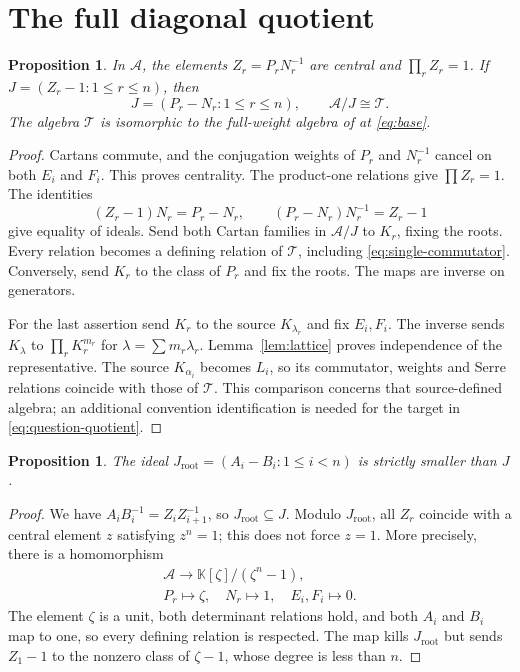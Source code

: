 \documentclass[11pt]{article}
\newtheorem{proposition}[theorem]{Proposition}
\theoremstyle{definition}
\theoremstyle{remark}
\newcommand{\kk}{\mathbb{K}}
\newcommand{\cA}{\mathcal{A}}
\newcommand{\cT}{\mathcal{T}}
\begin{document}
\section{The full diagonal quotient}\label{sec:quotient}

\begin{proposition}\label{prop:quotient}
In $\cA$, the elements $Z_r=P_rN_r^{-1}$ are central and $\prod_rZ_r=1$. If $J=(Z_r-1:1\leq r\leq n)$, then
\[
 J=(P_r-N_r:1\leq r\leq n),\qquad \cA/J\cong\cT.
\]
The algebra $\cT$ is isomorphic to the full-weight algebra of \cite[Definition 2.13]{VY} at \eqref{eq:base}.
\end{proposition}
\begin{proof}
Cartans commute, and the conjugation weights of $P_r$ and $N_r^{-1}$ cancel on both $E_i$ and $F_i$. This proves centrality. The product-one relations give $\prod Z_r=1$. The identities
\[
 (Z_r-1)N_r=P_r-N_r,\qquad (P_r-N_r)N_r^{-1}=Z_r-1
\]
give equality of ideals. Send both Cartan families in $\cA/J$ to $K_r$, fixing the roots. Every relation becomes a defining relation of $\cT$, including \eqref{eq:single-commutator}. Conversely, send $K_r$ to the class of $P_r$ and fix the roots. The maps are inverse on generators.

For the last assertion send $K_r$ to the source $K_{\lambda_r}$ and fix $E_i,F_i$. The inverse sends $K_\lambda$ to $\prod_rK_r^{m_r}$ for $\lambda=\sum m_r\lambda_r$. Lemma~\ref{lem:lattice} proves independence of the representative. The source $K_{\alpha_i}$ becomes $L_i$, so its commutator, weights and Serre relations coincide with those of $\cT$. This comparison concerns that source-defined algebra; an additional convention identification is needed for the target in \eqref{eq:question-quotient}.
\end{proof}

\begin{proposition}\label{prop:strict}
The ideal $J_{\mathrm{root}}=(A_i-B_i:1\leq i<n)$ is strictly smaller than $J$.
\end{proposition}
\begin{proof}
We have $A_iB_i^{-1}=Z_iZ_{i+1}^{-1}$, so $J_{\mathrm{root}}\subseteq J$. Modulo $J_{\mathrm{root}}$, all $Z_r$ coincide with a central element $z$ satisfying $z^n=1$; this does not force $z=1$. More precisely, there is a homomorphism
\[
 \begin{gathered}
 \cA\longrightarrow\kk[\zeta]/(\zeta^n-1),\\
 P_r\longmapsto\zeta,\quad N_r\longmapsto1,\quad E_i,F_i\longmapsto0.
 \end{gathered}
\]
The element $\zeta$ is a unit, both determinant relations hold, and both $A_i$ and $B_i$ map to one, so every defining relation is respected. The map kills $J_{\mathrm{root}}$ but sends $Z_1-1$ to the nonzero class of $\zeta-1$, whose degree is less than $n$.
\end{proof}
\end{document}
